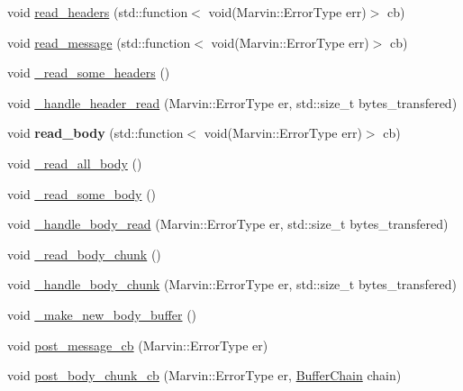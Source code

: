 \begin{DoxyCompactItemize}
\item 
void \hyperlink{class_message_reader_a9109576c1fd18d70e9187744164c390c}{read\+\_\+headers} (std\+::function$<$ void(Marvin\+::\+Error\+Type err)$>$ cb)
\item 
void \hyperlink{class_message_reader_a71a8b0ca7cc3aab28ee5fd9353f1b843}{read\+\_\+message} (std\+::function$<$ void(Marvin\+::\+Error\+Type err)$>$ cb)
\item 
void \hyperlink{class_message_reader_a73def02a6454f8c90df358790d798718}{\+\_\+read\+\_\+some\+\_\+headers} ()
\item 
void \hyperlink{class_message_reader_a545048a118c1d77940886544742dd9c0}{\+\_\+handle\+\_\+header\+\_\+read} (Marvin\+::\+Error\+Type er, std\+::size\+\_\+t bytes\+\_\+transfered)
\item 
\mbox{\label{class_message_reader_a2f4c0d98a480e64f8d769c64f713b5c1}} 
void {\bfseries read\+\_\+body} (std\+::function$<$ void(Marvin\+::\+Error\+Type err)$>$ cb)
\item 
void \hyperlink{class_message_reader_a5d38bae22274c77c8bf7b704aef2bccc}{\+\_\+read\+\_\+all\+\_\+body} ()
\item 
void \hyperlink{class_message_reader_acc54adf0f70b46dfcd73d017b1bb422c}{\+\_\+read\+\_\+some\+\_\+body} ()
\item 
void \hyperlink{class_message_reader_a366ff67eab28c15869657c436babf31e}{\+\_\+handle\+\_\+body\+\_\+read} (Marvin\+::\+Error\+Type er, std\+::size\+\_\+t bytes\+\_\+transfered)
\item 
void \hyperlink{class_message_reader_a10d3092b2b3200eaf9b69e49d36d1d69}{\+\_\+read\+\_\+body\+\_\+chunk} ()
\item 
void \hyperlink{class_message_reader_af174bd59d03d7e462f76d137b22863f2}{\+\_\+handle\+\_\+body\+\_\+chunk} (Marvin\+::\+Error\+Type er, std\+::size\+\_\+t bytes\+\_\+transfered)
\item 
void \hyperlink{class_message_reader_a4272b25b74e5b46f37754751da8689c5}{\+\_\+make\+\_\+new\+\_\+body\+\_\+buffer} ()
\item 
void \hyperlink{class_message_reader_a8df7f104650383e80e69a3d212b1e049}{post\+\_\+message\+\_\+cb} (Marvin\+::\+Error\+Type er)
\item 
void \hyperlink{class_message_reader_a82f75653a713d3b947ff3dee82a34d1f}{post\+\_\+body\+\_\+chunk\+\_\+cb} (Marvin\+::\+Error\+Type er, \hyperlink{class_buffer_chain}{Buffer\+Chain} chain)

\end{DoxyCompactItemize}
